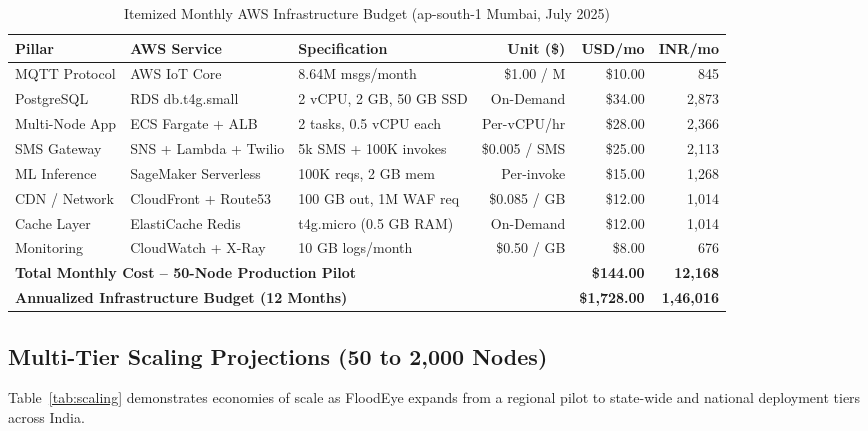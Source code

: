 \documentclass[11pt,a4paper]{article}
\begin{document}
\begin{table}[htbp]
\centering
\renewcommand{\arraystretch}{1.2}
\footnotesize
\begin{tabularx}{\linewidth}{l l X r r r}
\toprule
\textbf{Pillar} & \textbf{AWS Service} & \textbf{Specification} & \textbf{Unit (\$)} & \textbf{USD/mo} & \textbf{INR/mo} \\
\midrule
MQTT Protocol   & AWS IoT Core         & 8.64M msgs/month        & \$1.00 / M     & \$10.00  & 845 \\
PostgreSQL      & RDS db.t4g.small     & 2 vCPU, 2 GB, 50 GB SSD & On-Demand      & \$34.00  & 2,873 \\
Multi-Node App  & ECS Fargate + ALB    & 2 tasks, 0.5 vCPU each  & Per-vCPU/hr    & \$28.00  & 2,366 \\
SMS Gateway     & SNS + Lambda + Twilio & 5k SMS + 100K invokes  & \$0.005 / SMS  & \$25.00  & 2,113 \\
ML Inference    & SageMaker Serverless & 100K reqs, 2 GB mem     & Per-invoke     & \$15.00  & 1,268 \\
CDN / Network   & CloudFront + Route53 & 100 GB out, 1M WAF req  & \$0.085 / GB   & \$12.00  & 1,014 \\
Cache Layer     & ElastiCache Redis    & t4g.micro (0.5 GB RAM)  & On-Demand      & \$12.00  & 1,014 \\
Monitoring      & CloudWatch + X-Ray   & 10 GB logs/month        & \$0.50 / GB    & \$8.00   & 676 \\
\midrule
\multicolumn{4}{l}{\textbf{Total Monthly Cost -- 50-Node Production Pilot}} & \textbf{\$144.00} & \textbf{12,168} \\
\multicolumn{4}{l}{\textbf{Annualized Infrastructure Budget (12 Months)}}   & \textbf{\$1,728.00} & \textbf{1,46,016} \\
\bottomrule
\end{tabularx}
\caption{Itemized Monthly AWS Infrastructure Budget (ap-south-1 Mumbai, July 2025)}
\label{tab:cost}
\end{table}

\subsection{Multi-Tier Scaling Projections (50 to 2,000 Nodes)}

Table~\ref{tab:scaling} demonstrates economies of scale as FloodEye expands from a regional pilot to state-wide and national deployment tiers across India.
\end{document}
